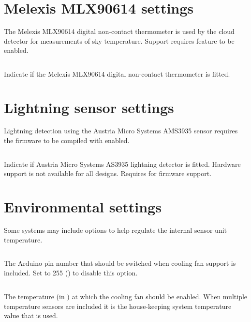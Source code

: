 
\section{Melexis MLX90614 settings}

The Melexis MLX90614 digital non-contact thermometer is used by the
cloud detector for measurements of sky temperature. Support requires
 feature to be enabled.


\subsection[mlx90614-present]{}

Indicate if the Melexis MLX90614 digital non-contact thermometer is fitted.

\section{Lightning sensor settings}

Lightning detection using the Austria Micro Systems AMS3935 sensor
requires the firmware to be compiled with 
enabled.

\subsection[as3935-present]{}
Indicate if Austria Micro Systems AS3935 lightning detector is
fitted. Hardware support is not available for all designs. Requires
 for firmware support.


\section{Environmental settings}
Some systems may include options to help regulate the internal sensor
unit temperature.

\subsection[fan-pin]{}
The Arduino pin number that should be switched when cooling fan
support is included. Set to 255 () to
disable this option.

\subsection[fan-temperature]{}
The temperature (in \degC{}) at which the cooling fan should be
enabled. When multiple temperature sensors are included it is the
house-keeping system temperature value that is used.

